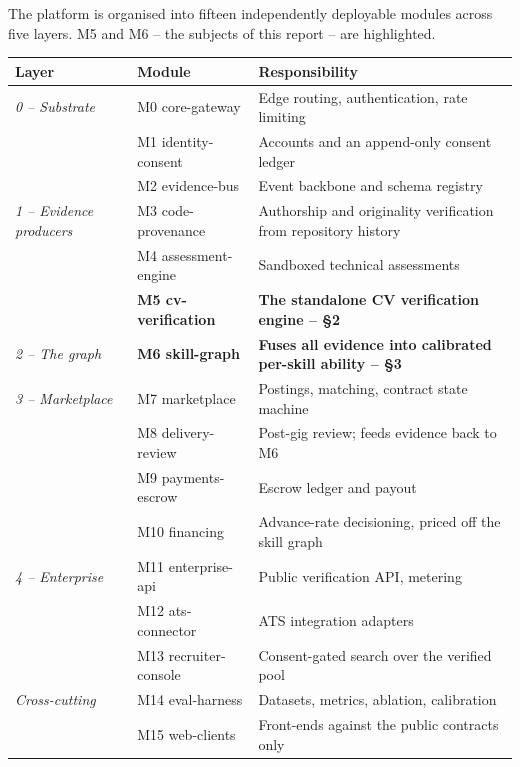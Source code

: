 \documentclass[11pt,a4paper]{article}
\begin{document}
The platform is organised into fifteen independently deployable modules
across five layers. M5 and M6 -- the subjects of this report -- are
highlighted.

\begin{center}\small
\begin{tabular}{@{}lL{2.6cm}L{9.4cm}@{}}
\toprule
\textbf{Layer} & \textbf{Module} & \textbf{Responsibility} \\
\midrule
\textit{0 -- Substrate} & M0 core-gateway & Edge routing, authentication, rate limiting \\
 & M1 identity-consent & Accounts and an append-only consent ledger \\
 & M2 evidence-bus & Event backbone and schema registry \\
\midrule
\textit{1 -- Evidence producers} & M3 code-provenance & Authorship and originality verification from repository history \\
 & M4 assessment-engine & Sandboxed technical assessments \\
 & \textbf{M5 cv-verification} & \textbf{The standalone CV verification engine -- \S2} \\
\midrule
\textit{2 -- The graph} & \textbf{M6 skill-graph} & \textbf{Fuses all evidence into calibrated per-skill ability -- \S3} \\
\midrule
\textit{3 -- Marketplace} & M7 marketplace & Postings, matching, contract state machine \\
 & M8 delivery-review & Post-gig review; feeds evidence back to M6 \\
 & M9 payments-escrow & Escrow ledger and payout \\
 & M10 financing & Advance-rate decisioning, priced off the skill graph \\
\midrule
\textit{4 -- Enterprise} & M11 enterprise-api & Public verification API, metering \\
 & M12 ats-connector & ATS integration adapters \\
 & M13 recruiter-console & Consent-gated search over the verified pool \\
\midrule
\textit{Cross-cutting} & M14 eval-harness & Datasets, metrics, ablation, calibration \\
 & M15 web-clients & Front-ends against the public contracts only \\
\bottomrule
\end{tabular}
\end{center}
\end{document}
